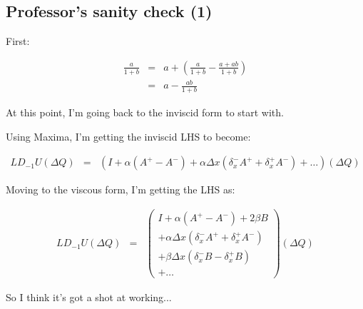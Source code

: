 \subsection{Professor's sanity check (1)}

First:

\begin{eqnarray}
\frac{a}{1 + b}
&=&
a + \left(\frac{a}{1 + b} - \frac{a + ab}{1 + b} \right)
\nonumber
\\
&=&
a - \frac{ab}{1 + b} 
\nonumber
\end{eqnarray}

At this point, I'm going back to the inviscid form to start with.

Using Maxima, I'm getting the inviscid LHS to become:

\begin{eqnarray}
L D_{-1} U 
\left(\Delta Q \right)
&=&
\left(I 
+ \alpha \left(A^+ - A^- \right)
+ \alpha \Delta x \left(\delta_x^- A^+ + \delta_x^+ A^- \right) 
+ \ldots \right)
\left(\Delta Q \right)
\nonumber
\end{eqnarray}

Moving to the viscous form, I'm getting the LHS as:

\begin{eqnarray}
L D_{-1} U 
\left(\Delta Q \right)
&=&
\left(
\begin{array}{c}
I 
+ \alpha \left(A^+ - A^- \right)
+ 2 \beta B
\\
+ \alpha \Delta x \left(\delta_x^- A^+ + \delta_x^+ A^- \right) 
\\
+ \beta \Delta x \left(\delta_x^- B - \delta_x^+ B \right) 
\\
+ \ldots 
\end{array}
\right)
\left(\Delta Q \right)
\nonumber
\end{eqnarray}

So I think it's got a shot at working...
